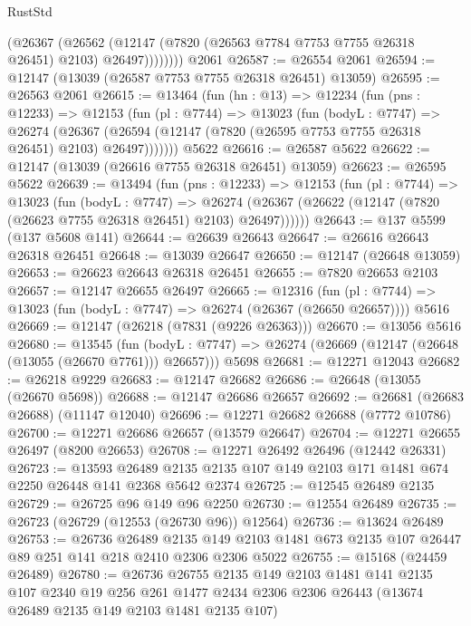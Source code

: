 \begin{lexlean}{RustStd}
\begin{coremodule}
              (@26367
                (@26562
                  (@12147 (@7820 (@26563 @7784 @7753 @7755 @26318 @26451) @2103) @26497))))))))
    @2061
@26587 := @26554 @2061
@26594 := @12147 (@13039 (@26587 @7753 @7755 @26318 @26451) @13059)
@26595 := @26563 @2061
@26615 := @13464
    (fun (hn : @13) =>
    @12234
      (fun (pns : @12233) =>
      @12153
        (fun (pl : @7744) =>
        @13023
          (fun (bodyL : @7747) =>
          @26274
            (@26367 (@26594 (@12147 (@7820 (@26595 @7753 @7755 @26318 @26451) @2103) @26497)))))))
    @5622
@26616 := @26587 @5622
@26622 := @12147 (@13039 (@26616 @7755 @26318 @26451) @13059)
@26623 := @26595 @5622
@26639 := @13494
    (fun (pns : @12233) =>
    @12153
      (fun (pl : @7744) =>
      @13023
        (fun (bodyL : @7747) =>
        @26274 (@26367 (@26622 (@12147 (@7820 (@26623 @7755 @26318 @26451) @2103) @26497))))))
@26643 := @137 @5599 (@137 @5608 @141)
@26644 := @26639 @26643
@26647 := @26616 @26643 @26318 @26451
@26648 := @13039 @26647
@26650 := @12147 (@26648 @13059)
@26653 := @26623 @26643 @26318 @26451
@26655 := @7820 @26653 @2103
@26657 := @12147 @26655 @26497
@26665 := @12316
    (fun (pl : @7744) => @13023 (fun (bodyL : @7747) => @26274 (@26367 (@26650 @26657))))
    @5616
@26669 := @12147 (@26218 (@7831 (@9226 @26363)))
@26670 := @13056 @5616
@26680 := @13545
    (fun (bodyL : @7747) => @26274 (@26669 (@12147 (@26648 (@13055 (@26670 @7761))) @26657)))
    @5698
@26681 := @12271 @12043
@26682 := @26218 @9229
@26683 := @12147 @26682
@26686 := @26648 (@13055 (@26670 @5698))
@26688 := @12147 @26686 @26657
@26692 := @26681 (@26683 @26688) (@11147 @12040)
@26696 := @12271 @26682 @26688 (@7772 @10786)
@26700 := @12271 @26686 @26657 (@13579 @26647)
@26704 := @12271 @26655 @26497 (@8200 @26653)
@26708 := @12271 @26492 @26496 (@12442 @26331)
@26723 := @13593
    @26489
    @2135
    @2135
    @107
    @149
    @2103
    @171
    @1481
    @674
    @2250
    @26448
    @141
    @2368
    @5642
    @2374
@26725 := @12545 @26489 @2135
@26729 := @26725 @96 @149 @96 @2250
@26730 := @12554 @26489
@26735 := @26723 (@26729 (@12553 (@26730 @96)) @12564)
@26736 := @13624 @26489
@26753 := @26736
    @26489
    @2135
    @149
    @2103
    @1481
    @673
    @2135
    @107
    @26447
    @89
    @251
    @141
    @218
    @2410
    @2306
    @2306
    @5022
@26755 := @15168 (@24459 @26489)
@26780 := @26736
    @26755
    @2135
    @149
    @2103
    @1481
    @141
    @2135
    @107
    @2340
    @19
    @256
    @261
    @1477
    @2434
    @2306
    @2306
    @26443
    (@13674 @26489 @2135 @149 @2103 @1481 @2135 @107)

\end{coremodule}
\end{lexlean}
